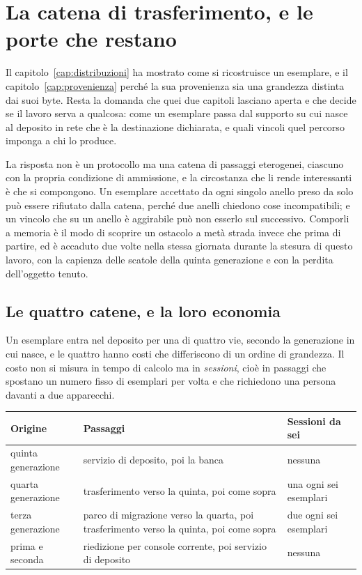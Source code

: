 \chapter{La catena di trasferimento, e le porte che restano}
\label{cap:catena}

Il capitolo~\ref{cap:distribuzioni} ha mostrato come si ricostruisce un esemplare, e il capitolo~\ref{cap:provenienza} perché la sua provenienza sia una grandezza distinta dai suoi byte. Resta la domanda che quei due capitoli lasciano aperta e che decide se il lavoro serva a qualcosa: come un esemplare passa dal supporto su cui nasce al deposito in rete che è la destinazione dichiarata, e quali vincoli quel percorso imponga a chi lo produce.

La risposta non è un protocollo ma una catena di passaggi eterogenei, ciascuno con la propria condizione di ammissione, e la circostanza che li rende interessanti è che si compongono. Un esemplare accettato da ogni singolo anello preso da solo può essere rifiutato dalla catena, perché due anelli chiedono cose incompatibili; e un vincolo che su un anello è aggirabile può non esserlo sul successivo. Comporli a memoria è il modo di scoprire un ostacolo a metà strada invece che prima di partire, ed è accaduto due volte nella stessa giornata durante la stesura di questo lavoro, con la capienza delle scatole della quinta generazione e con la perdita dell'oggetto tenuto.

\section{Le quattro catene, e la loro economia}

Un esemplare entra nel deposito per una di quattro vie, secondo la generazione in cui nasce, e le quattro hanno costi che differiscono di un ordine di grandezza. Il costo non si misura in tempo di calcolo ma in \emph{sessioni}, cioè in passaggi che spostano un numero fisso di esemplari per volta e che richiedono una persona davanti a due apparecchi.

\begin{center}
\begin{tabular}{@{}p{}p{}p{}@{}}
\hline
\textbf{Origine} & \textbf{Passaggi} & \textbf{Sessioni da sei} \\
\hline
quinta generazione & servizio di deposito, poi la banca & nessuna \\
quarta generazione & trasferimento verso la quinta, poi come sopra & una ogni sei esemplari \\
terza generazione & parco di migrazione verso la quarta, poi trasferimento verso la quinta, poi come sopra & due ogni sei esemplari \\
prima e seconda & riedizione per console corrente, poi servizio di deposito & nessuna \\
\hline
\end{tabular}
\end{center}

